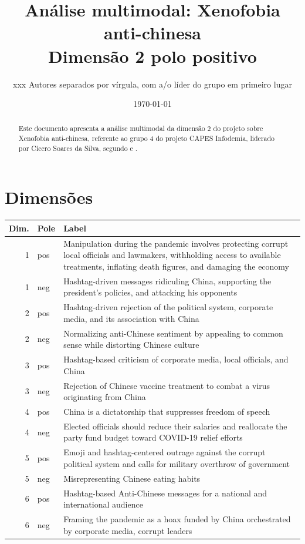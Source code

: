 \documentclass[aspectratio=169]{article}
\title{Análise multimodal: Xenofobia anti-chinesa\\Dimensão 2 polo positivo}
\author{xxx Autores separados por vírgula, com a/o líder do grupo em primeiro lugar}
\date{\today}
\begin{document}
\maketitle

\begin{abstract}
Este documento apresenta a análise multimodal da dimensão 2 do projeto sobre Xenofobia anti-chinesa, referente ao grupo 4 do projeto CAPES Infodemia, liderado por Cícero Soares da Silva, segundo  e .
\end{abstract}

\section{Dimensões}

\begin{table}[H]
\begin{tabular}{r l  p{}} \hline
Dim.&Pole& Label \\ \hline
1&pos&Manipulation during the pandemic involves protecting corrupt local officials and lawmakers, withholding access to available treatments, inflating death figures, and damaging the economy \\
1&neg&Hashtag-driven messages ridiculing China, supporting the president's policies, and attacking his opponents \\ \hline
2&pos&Hashtag-driven rejection of the political system, corporate media, and its association with China \\
2&neg&Normalizing anti-Chinese sentiment by appealing to common sense while distorting Chinese culture \\  \hline
3&pos&Hashtag-based criticism of corporate media, local officials, and China \\
3&neg&Rejection of Chinese vaccine treatment to combat a virus originating from China \\  \hline
4&pos&China is a dictatorship that suppresses freedom of speech  \\
4&neg&Elected officials should reduce their salaries and reallocate the party fund budget toward COVID-19 relief efforts \\  \hline
5&pos&Emoji and hashtag-centered outrage against the corrupt political system and calls for military overthrow of government  \\
5&neg&Misrepresenting Chinese eating habits \\  \hline
6&pos&Hashtag-based Anti-Chinese messages for a national and international audience  \\
6&neg&Framing the pandemic as a hoax funded by China orchestrated by corporate media, corrupt leaders \\
\hline
\end{tabular}
\end{table}
\end{document}

